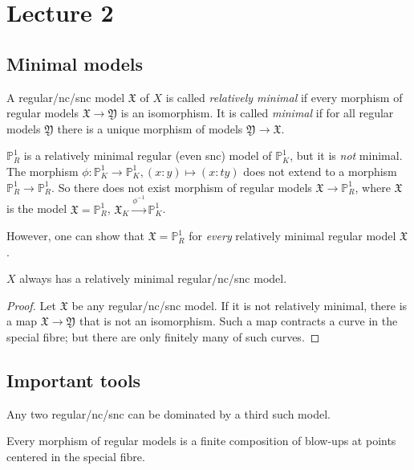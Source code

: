 \section{Lecture 2}

\subsection{Minimal models}

A regular/nc/snc model $\mathfrak{X}$ of $X$ is called \emph{relatively
minimal} if every morphism of regular models $\mathfrak{X} \to \mathfrak{Y}$ is
an isomorphism. It is called \emph{minimal} if for all regular models
$\mathfrak{Y}$ there is a unique morphism of models $\mathfrak{Y} \to
\mathfrak{X}$.
\begin{example}
	$\mathbb{P}^{1}_{R}$ is a relatively minimal regular (even snc) model
	of $\mathbb{P}^{1}_{K}$, but it is \emph{not} minimal. The morphism
	$\phi \colon \mathbb{P}^{1}_{K} \to \mathbb{P}^{1}_{K}, (x : y) \mapsto
	(x : ty)$ does not extend to a morphism $\mathbb{P}^{1}_{R} \to
	\mathbb{P}^{1}_{R}$. So there does not exist morphism of regular models
	$\mathfrak{X} \to \mathbb{P}^{1}_{R}$, where $\mathfrak{X}$ is the
	model $\mathfrak{X} = \mathbb{P}^{1}_{R}$, $\mathfrak{X}_{K}
	\stackrel{\phi^{-1}}{\longrightarrow} \mathbb{P}^{1}_{K}$.

	However, one can show that $\mathfrak{X} = \mathbb{P}^{1}_{R}$ for
	\emph{every} relatively minimal regular model $\mathfrak{X}$.
\end{example}

\begin{proposition}
	$X$ always has a relatively minimal regular/nc/snc model.
	\begin{proof}
		Let $\mathfrak{X}$ be any regular/nc/snc model. If it is not
		relatively minimal, there is a map $\mathfrak{X} \to
		\mathfrak{Y}$ that is not an isomorphism. Such a map contracts
		a curve in the special fibre; but there are only finitely many
		of such curves.
	\end{proof}
\end{proposition}

\subsection{Important tools}

Any two regular/nc/snc can be dominated by a third such model.

\begin{theorem}
	Every morphism of regular models is a finite composition of blow-ups at
	points centered in the special fibre.
\end{theorem}

